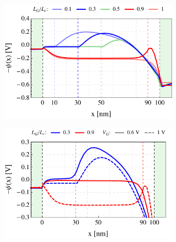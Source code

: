 \documentclass[11pt, a4paper]{article}
\begin{document}
\newpage
\begin{figure}%
\centering
	\begin{subfigure}{0.245\linewidth}
		\centering
		\includegraphics[width=1\linewidth]{potxPG100}
		\caption{}\label{fig:3:2a}
	\end{subfigure}
	\begin{subfigure}{0.245\linewidth}
		\centering
		\includegraphics[width=1\linewidth]{potxPG100vg0610}
		\caption{}\label{fig:3:4a}
	\end{subfigure}

\end{figure}
\end{document}
